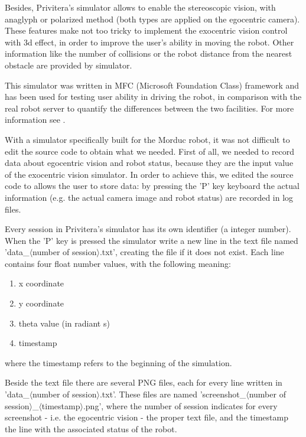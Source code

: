 %
Besides, Privitera's simulator allows to enable the 
stereoscopic vision, with anaglyph or polarized method (both 
types are applied on the egocentric camera). These features 
make not too tricky to implement the exocentric vision control 
with 3d effect, in order to improve the user's ability in 
moving the robot. Other information like the number of collisions 
or the robot distance from the nearest obstacle are provided 
by simulator.
%

%
This simulator was written in MFC (Microsoft Foundation Class) 
framework and has been used for testing user ability in
driving the robot, in comparison with the real robot server 
to quantify the differences between the two facilities. 
For more information see \cite{privitera}.
%

%
With a simulator specifically built for the Morduc robot, it 
was not difficult to edit the source code to obtain what we 
needed. First of all, we needed to record data about egocentric 
vision and robot status, because they are the input value 
of the exocentric vision simulator. In order to achieve this, 
we edited the source code to allows the user to store data: by 
pressing the 'P' key keyboard the actual information (e.g. the 
actual camera image and robot status) are recorded in log files.
%

%
Every session in Privitera's simulator has its own identifier 
(a integer number). When the 'P' key is pressed the simulator 
write a new line in the text file named 'data\_$\langle$number 
of session$\rangle$.txt', creating the file if it does not 
exist. Each line contains four float number values, with the 
following meaning:
%
\begin{enumerate}
\item x coordinate
\item y coordinate
\item theta value (in radiant s)
\item timestamp
\end{enumerate}
%
where the timestamp refers to the beginning of the simulation.
%

%
Beside the text file there are several PNG files, each for every 
line written in 'data\_$\langle$number of session$\rangle$.txt'. 
These files are named 'screenshot\_$\langle$number of 
session$\rangle$\_$\langle$timestamp$\rangle$.png', where the 
number of session indicates for every screenshot 
- i.e. the egocentric vision - the proper text file, and the 
timestamp the line with the associated status of the robot.
%

